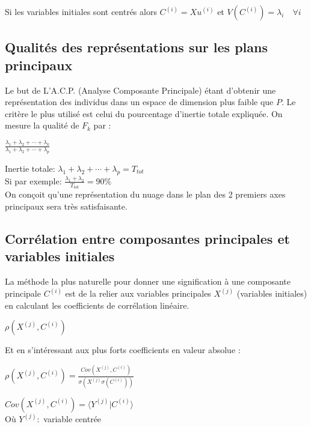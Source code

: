\documentclass[a4paper, 12pt]{article}
\begin{document}
Si les variables initiales sont centrés alors $C^{(i)} = Xu^{(i)}$ et $\boxed{V(C^{(i)}) = \lambda_i} \quad \forall i$


\subsection{Qualités des représentations sur les plans principaux}

Le but de L'A.C.P. (Analyse Composante Principale) étant d'obtenir une représentation des individus dans un espace de dimension plus faible que $P$. Le critère le plus utilisé est celui du pourcentage d'inertie totale expliquée. On mesure la qualité de $F_k$ par : \\
\begin{center}
\LARGE
$\frac{\lambda_1 + \lambda_2 + \cdots + \lambda_k}{\lambda_1 + \lambda_2 + \cdots + \lambda_p}$
\end{center}

\begin{flushleft}
Inertie totale: $\lambda_1 + \lambda_2 + \cdots + \lambda_p = T_{tot}$ \\
Si par exemple: $\frac{\lambda_1 + \lambda_2}{T_{tot}} = 90\%$ \\
On conçoit qu'une représentation du nuage dans le plan des 2 premiers axes principaux sera très satisfaisante.
\end{flushleft}


\subsection{Corrélation entre composantes principales et variables initiales}
\begin{flushleft}
La méthode la plus naturelle pour donner une signification à une composante principale $C^{(i)}$ est de la relier aux variables principales $X^{(j)}$ (variables initiales) en calculant les coefficients de corrélation linéaire.

\begin{center}
\large
$\rho (X^{(j)} , C^{(i)} )$
\end{center}

Et en s'intéressant aux plus forts coefficients en valeur absolue : \\
\begin{center}
$\boxed{\rho (X^{(j)}, C^{(i)}) = \frac{Cov (X^{(j)}, C^{(i)})}{\sigma (X^{(j)} \sigma (C^{(i)}))}}$
\end{center}

$Cov (X^{(j)}, C^{(i)}) = \langle Y^{(j)} | C^{(i)} \rangle$ \\

Où $Y^{(j)} : $ variable centrée
\end{flushleft}
\end{document}
